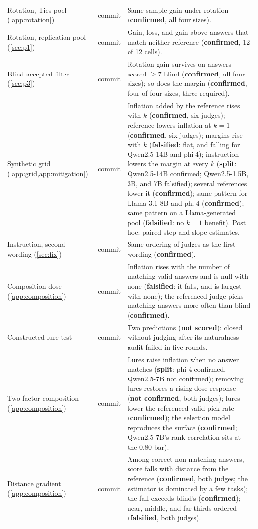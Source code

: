 {\begin{longtable}{L{3.2cm}L{1.1cm}L{8.7cm}}
Rotation, Ties pool (\cref{app:rotation}) & commit & Same-sample gain under rotation (\textbf{confirmed}, all four sizes). \\
Rotation, replication pool (\cref{sec:p1}) & commit & Gain, loss, and gain above answers that match neither reference (\textbf{confirmed}, 12 of 12 cells). \\
Blind-accepted filter (\cref{sec:p3}) & commit & Rotation gain survives on answers scored $\geq 7$ blind (\textbf{confirmed}, all four sizes); so does the margin (\textbf{confirmed}, four of four sizes, three required). \\
Synthetic grid (\cref{app:grid,app:mitigation}) & commit & Inflation added by the reference rises with $k$ (\textbf{confirmed}, six judges); reference lowers inflation at $k{=}1$ (\textbf{confirmed}, six judges); margins rise with $k$ (\textbf{falsified}: flat, and falling for Qwen2.5-14B and phi-4); instruction lowers the margin at every $k$ (\textbf{split}: Qwen2.5-14B confirmed; Qwen2.5-1.5B, 3B, and 7B falsified); several references lower it (\textbf{confirmed}); same pattern for Llama-3.1-8B and phi-4 (\textbf{confirmed}); same pattern on a Llama-generated pool (\textbf{falsified}: no $k{=}1$ benefit). Post hoc: paired step and slope estimates. \\
Instruction, second wording (\cref{sec:fix}) & commit & Same ordering of judges as the first wording (\textbf{confirmed}). \\
Composition dose (\cref{app:composition}) & commit & Inflation rises with the number of matching valid answers and is null with none (\textbf{falsified}: it falls, and is largest with none); the referenced judge picks matching answers more often than blind (\textbf{confirmed}). \\
Constructed lure test & commit & Two predictions (\textbf{not scored}): closed without judging after its naturalness audit failed in five rounds. \\
Two-factor composition (\cref{app:composition}) & commit & Lures raise inflation when no answer matches (\textbf{split}: phi-4 confirmed, Qwen2.5-7B not confirmed); removing lures restores a rising dose response (\textbf{not confirmed}, both judges); lures lower the referenced valid-pick rate (\textbf{confirmed}); the selection model reproduces the surface (\textbf{confirmed}; Qwen2.5-7B's rank correlation sits at the 0.80 bar). \\
Distance gradient (\cref{app:composition}) & commit & Among correct non-matching answers, score falls with distance from the reference (\textbf{confirmed}, both judges; the estimator is dominated by a few tasks); the fall exceeds blind's (\textbf{confirmed}); near, middle, and far thirds ordered (\textbf{falsified}, both judges). \\

\end{longtable}}
